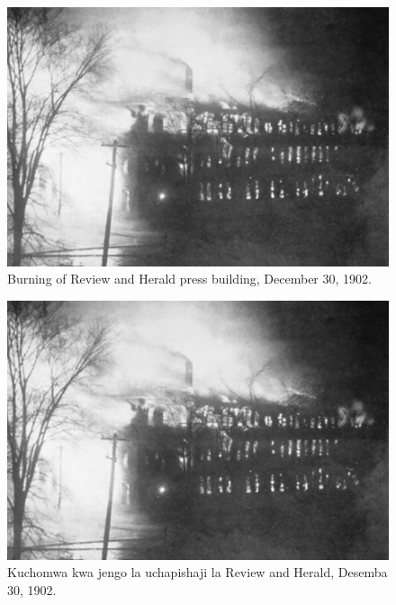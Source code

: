 \begin{figure}[h]
    \centering
    \includegraphics[width=1\linewidth]{images/review-and-herlad.jpg}
    \caption*{Burning of Review and Herald press building, December 30, 1902.}
    \label{fig:review-and-herald}
\end{figure}


\begin{figure}[h]
    \centering
    \includegraphics[width=1\linewidth]{images/review-and-herlad.jpg}
    \caption*{Kuchomwa kwa jengo la uchapishaji la Review and Herald, Desemba 30, 1902.}
    \label{fig:review-and-herald}
\end{figure}


